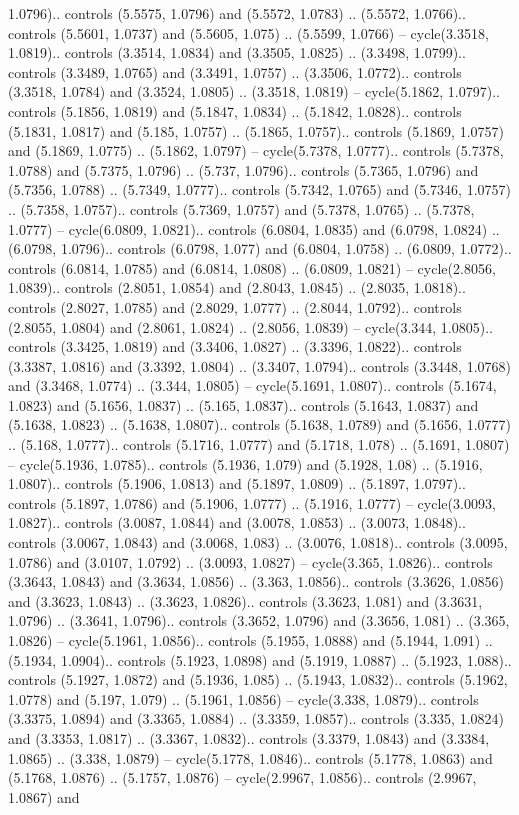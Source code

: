 1.0796).. controls (5.5575, 1.0796) and (5.5572, 1.0783) .. (5.5572, 1.0766).. controls (5.5601, 1.0737) and (5.5605, 1.075) .. (5.5599, 1.0766) -- cycle(3.3518, 1.0819).. controls (3.3514, 1.0834) and (3.3505, 1.0825) .. (3.3498, 1.0799).. controls (3.3489, 1.0765) and (3.3491, 1.0757) .. (3.3506, 1.0772).. controls (3.3518, 1.0784) and (3.3524, 1.0805) .. (3.3518, 1.0819) -- cycle(5.1862, 1.0797).. controls (5.1856, 1.0819) and (5.1847, 1.0834) .. (5.1842, 1.0828).. controls (5.1831, 1.0817) and (5.185, 1.0757) .. (5.1865, 1.0757).. controls (5.1869, 1.0757) and (5.1869, 1.0775) .. (5.1862, 1.0797) -- cycle(5.7378, 1.0777).. controls (5.7378, 1.0788) and (5.7375, 1.0796) .. (5.737, 1.0796).. controls (5.7365, 1.0796) and (5.7356, 1.0788) .. (5.7349, 1.0777).. controls (5.7342, 1.0765) and (5.7346, 1.0757) .. (5.7358, 1.0757).. controls (5.7369, 1.0757) and (5.7378, 1.0765) .. (5.7378, 1.0777) -- cycle(6.0809, 1.0821).. controls (6.0804, 1.0835) and (6.0798, 1.0824) .. (6.0798, 1.0796).. controls (6.0798, 1.077) and (6.0804, 1.0758) .. (6.0809, 1.0772).. controls (6.0814, 1.0785) and (6.0814, 1.0808) .. (6.0809, 1.0821) -- cycle(2.8056, 1.0839).. controls (2.8051, 1.0854) and (2.8043, 1.0845) .. (2.8035, 1.0818).. controls (2.8027, 1.0785) and (2.8029, 1.0777) .. (2.8044, 1.0792).. controls (2.8055, 1.0804) and (2.8061, 1.0824) .. (2.8056, 1.0839) -- cycle(3.344, 1.0805).. controls (3.3425, 1.0819) and (3.3406, 1.0827) .. (3.3396, 1.0822).. controls (3.3387, 1.0816) and (3.3392, 1.0804) .. (3.3407, 1.0794).. controls (3.3448, 1.0768) and (3.3468, 1.0774) .. (3.344, 1.0805) -- cycle(5.1691, 1.0807).. controls (5.1674, 1.0823) and (5.1656, 1.0837) .. (5.165, 1.0837).. controls (5.1643, 1.0837) and (5.1638, 1.0823) .. (5.1638, 1.0807).. controls (5.1638, 1.0789) and (5.1656, 1.0777) .. (5.168, 1.0777).. controls (5.1716, 1.0777) and (5.1718, 1.078) .. (5.1691, 1.0807) -- cycle(5.1936, 1.0785).. controls (5.1936, 1.079) and (5.1928, 1.08) .. (5.1916, 1.0807).. controls (5.1906, 1.0813) and (5.1897, 1.0809) .. (5.1897, 1.0797).. controls (5.1897, 1.0786) and (5.1906, 1.0777) .. (5.1916, 1.0777) -- cycle(3.0093, 1.0827).. controls (3.0087, 1.0844) and (3.0078, 1.0853) .. (3.0073, 1.0848).. controls (3.0067, 1.0843) and (3.0068, 1.083) .. (3.0076, 1.0818).. controls (3.0095, 1.0786) and (3.0107, 1.0792) .. (3.0093, 1.0827) -- cycle(3.365, 1.0826).. controls (3.3643, 1.0843) and (3.3634, 1.0856) .. (3.363, 1.0856).. controls (3.3626, 1.0856) and (3.3623, 1.0843) .. (3.3623, 1.0826).. controls (3.3623, 1.081) and (3.3631, 1.0796) .. (3.3641, 1.0796).. controls (3.3652, 1.0796) and (3.3656, 1.081) .. (3.365, 1.0826) -- cycle(5.1961, 1.0856).. controls (5.1955, 1.0888) and (5.1944, 1.091) .. (5.1934, 1.0904).. controls (5.1923, 1.0898) and (5.1919, 1.0887) .. (5.1923, 1.088).. controls (5.1927, 1.0872) and (5.1936, 1.085) .. (5.1943, 1.0832).. controls (5.1962, 1.0778) and (5.197, 1.079) .. (5.1961, 1.0856) -- cycle(3.338, 1.0879).. controls (3.3375, 1.0894) and (3.3365, 1.0884) .. (3.3359, 1.0857).. controls (3.335, 1.0824) and (3.3353, 1.0817) .. (3.3367, 1.0832).. controls (3.3379, 1.0843) and (3.3384, 1.0865) .. (3.338, 1.0879) -- cycle(5.1778, 1.0846).. controls (5.1778, 1.0863) and (5.1768, 1.0876) .. (5.1757, 1.0876) -- cycle(2.9967, 1.0856).. controls (2.9967, 1.0867) and 